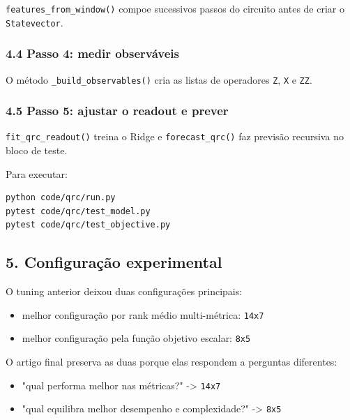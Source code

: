 \documentclass[12pt]{article}
\providecommand{\tightlist}{%
          \setlength{\itemsep}{0pt}\setlength{\parskip}{0pt}}
\begin{document}
\texttt{features\_from\_window()} compoe sucessivos passos do circuito antes de criar o \texttt{Statevector}.

\subsubsection{4.4 Passo 4: medir observáveis}\label{44-passo-4-medir-observuxe1veis}

O método \texttt{\_build\_observables()} cria as listas de operadores \texttt{Z}, \texttt{X} e \texttt{ZZ}.

\subsubsection{4.5 Passo 5: ajustar o readout e prever}\label{45-passo-5-ajustar-o-readout-e-prever}

\texttt{fit\_qrc\_readout()} treina o Ridge e \texttt{forecast\_qrc()} faz previsão recursiva no bloco de teste.

Para executar:

\begin{verbatim}
python code/qrc/run.py
pytest code/qrc/test_model.py
pytest code/qrc/test_objective.py
\end{verbatim}

\subsection{5. Configuração experimental}\label{5-configurauxe7uxe3o-experimental}

O tuning anterior deixou duas configurações principais:

\begin{itemize}
\tightlist
\item
  melhor configuração por rank médio multi-métrica: \texttt{14x7}
\item
  melhor configuração pela função objetivo escalar: \texttt{8x5}
\end{itemize}

O artigo final preserva as duas porque elas respondem a perguntas diferentes:

\begin{itemize}
\tightlist
\item
  "qual performa melhor nas métricas?" -\textgreater{} \texttt{14x7}
\item
  "qual equilibra melhor desempenho e complexidade?" -\textgreater{} \texttt{8x5}
\end{itemize}
\end{document}

